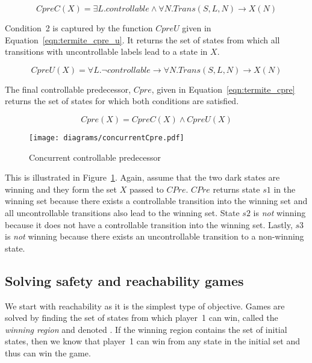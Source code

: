\begin{equation}
    CpreC(X) =  \exists L. controllable \land \forall N. Trans(S, L, N) \rightarrow X(N)
    \label{eqn:termite_cpre_c}
\end{equation}

Condition~2 is captured by the function $CpreU$ given in Equation~\ref{eqn:termite_cpre_u}. It returns the set of states from which all transitions with uncontrollable labels lead to a state in $X$.

\begin{equation}
    CpreU(X) =  \forall L. \neg controllable \rightarrow \forall N. Trans(S, L, N) \rightarrow X(N)
    \label{eqn:termite_cpre_u}
\end{equation}

The final controllable predecessor, $Cpre$, given in Equation~\ref{eqn:termite_cpre} returns the set of states for which both conditions are satisfied.

\begin{equation}
    Cpre(X) =  CpreC(X) \land CpreU(X)
    \label{eqn:termite_cpre}
\end{equation}

\begin{figure}[t]
\centering
\texttt{[image: diagrams/concurrentCpre.pdf]}
\caption{Concurrent controllable predecessor}
\label{fig:concurrent_cpre}
\end{figure}

This is illustrated in Figure~\ref{fig:concurrent_cpre}. Again, assume that the two dark states are winning and they form the set $X$ passed to $CPre$. $CPre$ returns state $s1$ in the winning set because there exists a controllable transition into the winning set and all uncontrollable transitions also lead to the winning set. State $s2$ is \emph{not} winning because it does not have a controllable transition into the winning set. Lastly, $s3$ is \emph{not} winning because there exists an uncontrollable transition to a non-winning state.

\subsection{Solving safety and reachability games}
\label{sec:back_solving_reach}

We start with reachability as it is the simplest type of objective. Games are solved by finding the set of states from which player~1 can win, called the \emph{winning region} and denoted \win. If the winning region contains the set of initial states, then we know that player~1 can win from any state in the initial set and thus can win the game.

